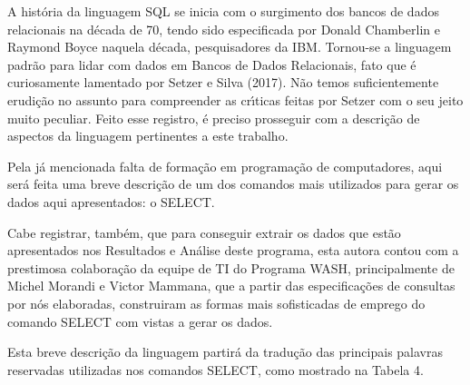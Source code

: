 \documentclass[
12pt,		%
openright,	%
twoside,  %
a4paper,			%
chapter=TITLE,		%
english,			%
french,				%
spanish,			%
brazil				%
]{USPSC-classe/USPSC}
\begin{document}
A hist\'oria da linguagem SQL se inicia com o surgimento dos bancos de dados relacionais na d\'ecada de 70, tendo sido  especificada por Donald Chamberlin e Raymond Boyce naquela d\'ecada, pesquisadores da IBM. Tornou-se a linguagem padr\~ao para lidar com dados em Bancos de Dados Relacionais, fato que \'e curiosamente lamentado por  Setzer e Silva (2017). N\~ao temos suficientemente erudi\c{c}\~ao no assunto para compreender as cr\'{\i}ticas feitas por Setzer com o seu jeito muito peculiar. Feito esse registro, \'e preciso prosseguir com a descri\c{c}\~ao de aspectos da linguagem pertinentes a este trabalho.

















Pela j\'a mencionada falta de forma\c{c}\~ao em programa\c{c}\~ao de computadores, aqui ser\'a feita uma breve descri\c{c}\~ao de um dos comandos mais utilizados para gerar os dados aqui apresentados: o SELECT.

















Cabe registrar, tamb\'em, que para conseguir extrair os dados que est\~ao apresentados nos Resultados e An\'alise deste programa, esta autora contou com a prestimosa colabora\c{c}\~ao da equipe de TI do Programa WASH, principalmente de Michel Morandi e Victor Mammana, que a partir das especifica\c{c}\~oes de consultas por n\'os elaboradas, construiram as formas mais sofisticadas de emprego do comando SELECT com vistas a gerar os dados.

















Esta breve descri\c{c}\~ao da linguagem partir\'a da tradu\c{c}\~ao das principais palavras reservadas utilizadas nos comandos SELECT, como mostrado na Tabela 4.
\end{document}
